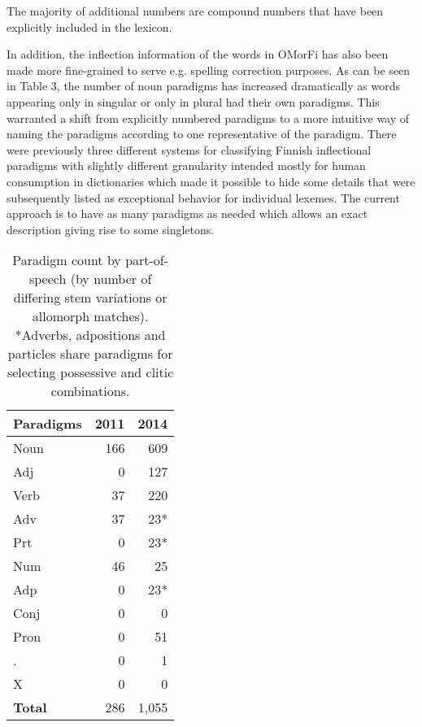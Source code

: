 \documentclass[11pt]{article}
\begin{document}
The majority of additional numbers are compound numbers that have been
explicitly included in the lexicon.

In addition, the inflection information of the words in OMorFi has also been
made more fine-grained to serve e.g. spelling correction purposes.  As can be
seen in Table 3, the number of noun paradigms has increased dramatically as
words appearing only in singular or only in plural had their own paradigms.
This warranted a shift from explicitly numbered paradigms to a more intuitive
way of naming the paradigms according to one representative of the paradigm.
There were previously three different systems for classifying Finnish
inflectional paradigms with slightly different granularity intended mostly for
human consumption in dictionaries which made it possible to hide some details
that were subsequently listed as exceptional behavior for individual lexemes.
The current approach is to have as many paradigms as needed which allows an
exact description giving rise to some singletons.  

\begin{table}[h]
    \begin{center}
        \begin{tabular}{|l|rr|}
            \hline
            \bf Paradigms  & \bf 2011 & \bf 2014 \\
            \hline
            \sc Noun           & 166      & 609 \\
            \sc Adj            & 0        & 127 \\
            \sc Verb           & 37       & 220 \\
            \sc Adv            & 37       & 23* \\
            \sc Prt            & 0        & 23* \\
            \sc Num            & 46       & 25 \\
            \sc Adp            & 0        & 23* \\
            \sc Conj           & 0        & 0 \\
            \sc Pron           & 0        & 51 \\
            \sc .              & 0        & 1  \\
            \sc X              & 0        & 0 \\
            \hline
            \bf Total          & 286      & 1,055 \\
            \hline
        \end{tabular}
    \end{center}
    \caption{Paradigm count by part-of-speech (by number of differing stem variations or allomorph matches). 
   *Adverbs, adpositions and particles share paradigms for selecting possessive and clitic combinations.}
\end{table}
\end{document}
